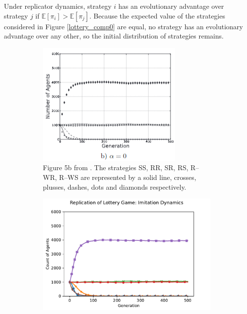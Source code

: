 \FloatBarrier
Under replicator dynamics, strategy $i$ has an evolutionary advantage over strategy $j$ if $\mathbb E [\pi_i] >\mathbb E [\pi_j]$. Because the expected value of the strategies considered in Figure \ref{lottery_comp0} are equal, no strategy has an evolutionary advantage over any other, so the initial distribution of strategies remains.
\FloatBarrier 
\begin{figure}[!h]
  \begin{subfigure}[b]{0.45\textwidth}
    \includegraphics[width=\textwidth]{images/lottery2.png}
    \caption{Figure 5b from \cite{RN30}. The strategies SS, RR, SR, RS, R--WR, R--WS are represented by a solid line, crosses, plusses, dashes, dots and diamonds respectively. }
    \label{lottery2}
  \end{subfigure}
  \hfill
  \begin{subfigure}[b]{0.45\textwidth}
    \includegraphics[width=1.25\textwidth]{images/lottery2_me.pdf}

\end{subfigure}
\end{figure}
